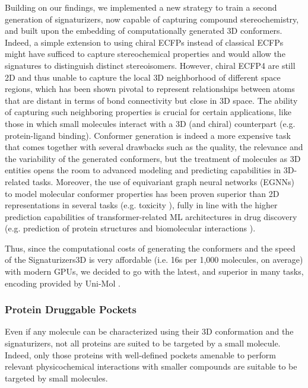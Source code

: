 Building on our findings, we implemented a new strategy to train a second generation of signaturizers, now capable of capturing compound stereochemistry, and built upon the embedding of computationally generated 3D conformers. Indeed, a simple extension to using chiral ECFPs instead of classical ECFPs might have sufficed to capture stereochemical properties and would allow the signatures to distinguish distinct stereoisomers. However, chiral ECFP4 are still 2D and thus unable to capture the local 3D neighborhood of different space regions, which has been shown pivotal to represent relationships between atoms that are distant in terms of bond connectivity but close in 3D space\cite{axen_simple_2017}. The ability of capturing such neighboring properties is crucial for certain applications, like those in which small molecules interact with a 3D (and chiral) counterpart (e.g. protein-ligand binding). Conformer generation is indeed a more expensive task that comes together with several drawbacks such as the quality, the relevance and the variability of the generated conformers, but the treatment of molecules as 3D entities opens the room to advanced modeling and predicting capabilities in 3D-related tasks. Moreover, the use of equivariant graph neural networks (EGNNs) to model molecular conformer properties has been proven superior than 2D representations in several tasks (e.g. toxicity \cite{cremer_equivariant_2023}), fully in line with the higher prediction capabilities of transformer-related ML architectures in drug discovery (e.g. prediction of protein structures and biomolecular interactions \cite{jumper_highly_2021, abramson_accurate_2024}).

Thus, since the computational costs of generating the conformers and the speed of the Signaturizers3D is very affordable (i.e. 16s per 1,000 molecules, on average) with modern GPUs, we decided to go with the latest, and superior in many tasks, encoding provided by Uni-Mol \cite{zhou_uni-mol_2022}. 

\subsubsection{Protein Druggable Pockets}

Even if any molecule can be characterized using their 3D conformation and the signaturizers, not all proteins are suited to be targeted by a small molecule. Indeed, only those proteins with well-defined pockets amenable to perform relevant physicochemical interactions with smaller compounds are suitable to be targeted by small molecules. 

